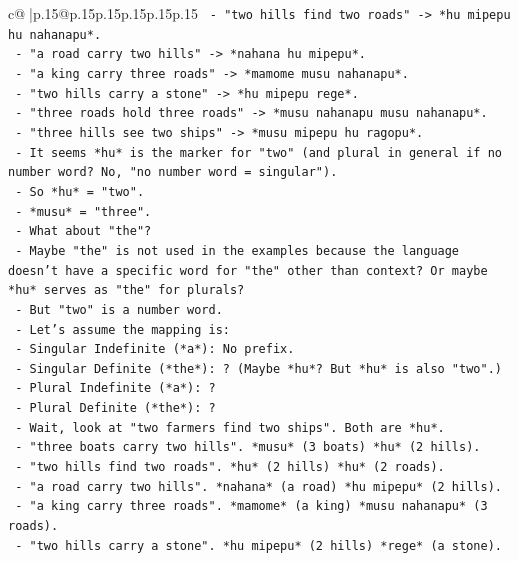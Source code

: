 \documentclass{article}
\begin{document}
{\begin{supertabular}{c@{$\;$}|p{.15\linewidth}@{}p{.15\linewidth}p{.15\linewidth}p{.15\linewidth}p{.15\linewidth}p{.15\linewidth}}
{{{\texttt{    {-} "two hills find two roads" {-}> *hu mipepu hu nahanapu*.} \\
\texttt{    {-} "a road carry two hills" {-}> *nahana hu mipepu*.} \\
\texttt{    {-} "a king carry three roads" {-}> *mamome musu nahanapu*.} \\
\texttt{    {-} "two hills carry a stone" {-}> *hu mipepu rege*.} \\
\texttt{    {-} "three roads hold three roads" {-}> *musu nahanapu musu nahanapu*.} \\
\texttt{    {-} "three hills see two ships" {-}> *musu mipepu hu ragopu*.} \\
\texttt{    {-} It seems *hu* is the marker for "two" (and plural in general if no number word? No, "no number word = singular").} \\
\texttt{    {-} So *hu* = "two".} \\
\texttt{    {-} *musu* = "three".} \\
\texttt{    {-} What about "the"?} \\
\texttt{    {-} Maybe "the" is not used in the examples because the language doesn't have a specific word for "the" other than context? Or maybe *hu* serves as "the" for plurals?} \\
\texttt{    {-} But "two" is a number word.} \\
\texttt{    {-} Let's assume the mapping is:} \\
\texttt{      {-} Singular Indefinite (*a*): No prefix.} \\
\texttt{      {-} Singular Definite (*the*): ? (Maybe *hu*? But *hu* is also "two".)} \\
\texttt{      {-} Plural Indefinite (*a*): ?} \\
\texttt{      {-} Plural Definite (*the*): ?} \\
\texttt{    {-} Wait, look at "two farmers find two ships". Both are *hu*.} \\
\texttt{    {-} "three boats carry two hills". *musu* (3 boats) *hu* (2 hills).} \\
\texttt{    {-} "two hills find two roads". *hu* (2 hills) *hu* (2 roads).} \\
\texttt{    {-} "a road carry two hills". *nahana* (a road) *hu mipepu* (2 hills).} \\
\texttt{    {-} "a king carry three roads". *mamome* (a king) *musu nahanapu* (3 roads).} \\
\texttt{    {-} "two hills carry a stone". *hu mipepu* (2 hills) *rege* (a stone).} \\
}}}
\end{supertabular}}
\end{document}
